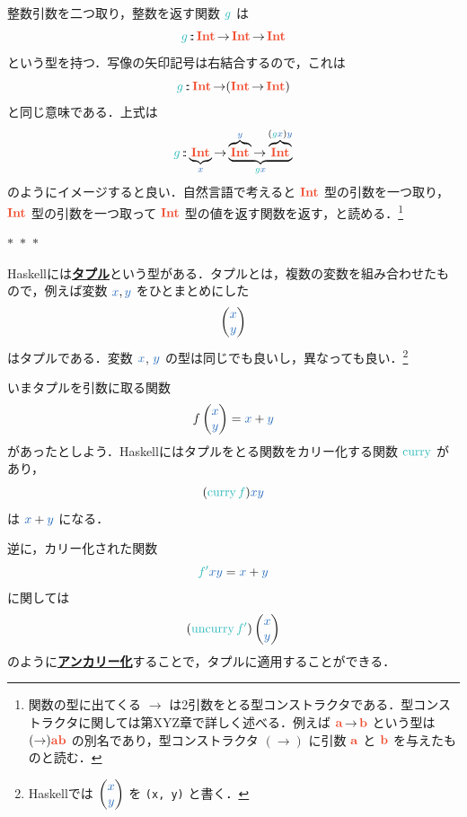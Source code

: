 \documentclass[a5paper,twoside,fleqn,draft]{jsbook}
\def\varColor{NavyBlue}
\def\funcColor{BlueGreen}
\def\typeColor{RedOrange}
\newcommand{\separator}{\begin{center}$*$~$*$~$*$\end{center}}
\newcommand{\programminglanguage}[1]{\textsf{#1}}
\newcommand{\haskell}{\programminglanguage{Haskell}}
\newcommand{\keyword}[1]{{\underline{\textbf{#1}}}}
\newcommand{\code}[1]{\texttt{#1}}
\newcommand{\mVar}[1]{\textcolor{\varColor}{#1}}
\newcommand{\mXVar}{\mVar{x}}
\newcommand{\mYVar}{\mVar{y}}
\newcommand{\mFunc}[1]{\textcolor{\funcColor}{#1}}
\newcommand{\mSpecialFunc}[1]{\textcolor{\funcColor}{\textrm{#1}}}
\newcommand{\mFFunc}{{\mFunc{f}}}
\newcommand{\mGFunc}{\mFunc{g}}
\newcommand{\mFFFunc}{\mFunc{f'}}
\DeclareMathOperator{\mCurry}{\mSpecialFunc{curry}}
\DeclareMathOperator{\mUncurry}{\mSpecialFunc{uncurry}}
\DeclareMathOperator{\mFuncArrow}{\rightarrow}
\DeclareMathOperator{\mIn}{{:\!:}}
\newcommand{\mType}[1]{\textcolor{\typeColor}{\mathbf{#1}}}
\newcommand{\mA}{\mType{a}}
\newcommand{\mB}{\mType{b}}
\newcommand{\mIntType}{\mType{Int}}
\newcommand{\mPairWith}[2]{\begin{pmatrix}#1\\#2\end{pmatrix}}
\begin{document}
整数引数を二つ取り，整数を返す関数 $\mGFunc$ は
\begin{equation}
  \mGFunc
  \mIn\mIntType\mFuncArrow\mIntType\mFuncArrow\mIntType
\end{equation}
という型を持つ．写像の矢印記号は右結合するので，これは
\begin{equation}
  \mGFunc
  \mIn\mIntType\mFuncArrow(\mIntType\mFuncArrow\mIntType)
\end{equation}
と同じ意味である．上式は
\begin{equation*}
  \mGFunc
  \mIn\underbrace{\mIntType}_{\mXVar}
  \mFuncArrow\underbrace{\overbrace{\mIntType}^{\mYVar}\mFuncArrow\overbrace{\mIntType}^{(\mGFunc\mXVar)\mYVar}}_{\mGFunc\mXVar}
\end{equation*}
のようにイメージすると良い．自然言語で考えると $\mIntType$ 型の引数を一つ取り，$\mIntType$ 型の引数を一つ取って $\mIntType$ 型の値を返す関数を返す，と読める．\footnote{関数の型に出てくる $\mFuncArrow$ は2引数をとる型コンストラクタである．型コンストラクタに関しては第XYZ章で詳しく述べる．例えば $\mA\mFuncArrow\mB$ という型は $(\mFuncArrow)\mA\mB$ の別名であり，型コンストラクタ $(\mFuncArrow)$ に引数 $\mA$ と $\mB$ を与えたものと読む．}

\separator

\haskell には\keyword{タプル}という型がある．タプルとは，複数の変数を組み合わせたもので，例えば変数 $\mXVar,\mYVar$ をひとまとめにした
\begin{equation}
  \mPairWith{\mXVar}{\mYVar}
\end{equation}
はタプルである．変数 $\mXVar$, $\mYVar$ の型は同じでも良いし，異なっても良い．\footnote{\haskell では $\mPairWith{\mXVar}{\mYVar}$ を \code{(x, y)} と書く．}

いまタプルを引数に取る関数
\begin{equation}
  f\mPairWith{\mXVar}{\mYVar}
  =\mXVar+\mYVar
\end{equation}
があったとしよう．\haskell にはタプルをとる関数をカリー化する関数 $\mCurry$ があり，
\begin{equation}
  (\mCurry\mFFunc)\mXVar\mYVar
\end{equation}
は $\mXVar+\mYVar$ になる．

逆に，カリー化された関数
\begin{equation}
  \mFFFunc\mXVar\mYVar
  =\mXVar+\mYVar
\end{equation}
に関しては
\begin{equation}
  (\mUncurry\mFFFunc)\mPairWith{\mXVar}{\mYVar}
\end{equation}
のように\keyword{アンカリー化}することで，タプルに適用することができる．
\end{document}
